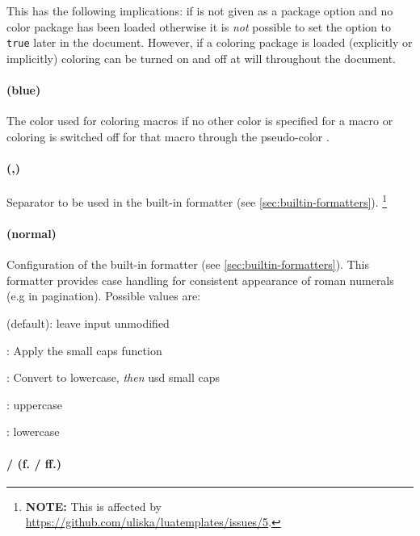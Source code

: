 \documentclass{scrartcl}
\begin{document}
This has the following implications: if  is not given as a package
option and no color package has been loaded otherwise it is \emph{not} possible
to set the option to \texttt{true} later in the document.  However, if a
coloring package is loaded (explicitly or implicitly) coloring can be turned on
and off at will throughout the document.


\paragraph{ (blue)}

The color used for coloring macros if no other color is specified for a macro or
coloring is switched off for that macro through the pseudo-color
.


\paragraph{ (,)}

Separator to be used in the built-in formatter  (see
\vref{sec:builtin-formatters}).%
\footnote{\textbf{NOTE:} This is affected by
\url{https://github.com/uliska/luatemplates/issues/5}.}


\paragraph{ (normal)}

Configuration of the built-in formatter  (see
\vref{sec:builtin-formatters}).  This formatter provides case handling for
consistent appearance of roman numerals (e.g in pagination).  Possible values
are:

\begin{itemize*}
\item {} (default): leave input unmodified
\item {}: Apply the small caps function
\item {}: Convert to lowercase, \emph{then} usd small caps
\item {}: uppercase
\item {}: lowercase
\end{itemize*}


\paragraph{ /  (f. / ff.)}
\end{document}
